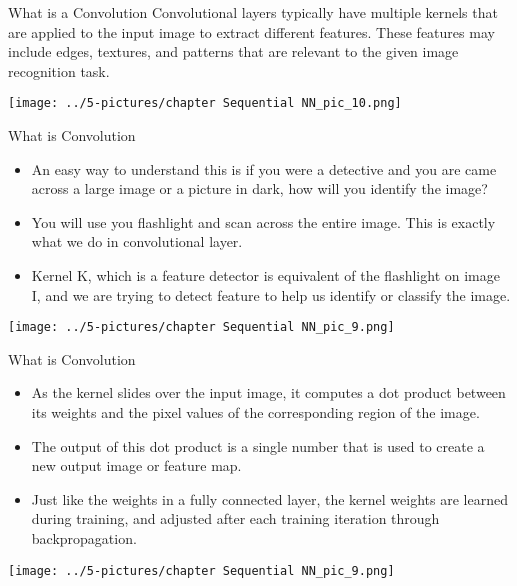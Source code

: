 \documentclass[11pt]{beamer}
\begin{document}
\begin{frame}{What is a Convolution}
\footnotesize{
Convolutional layers typically have multiple kernels that are applied to the input image to extract different features. These features may include edges, textures, and patterns that are relevant to the given image recognition task.}
	\begin{center}
	\texttt{[image: ../5-pictures/chapter Sequential NN\_pic\_10.png]}
	\end{center}
\end{frame}
\begin{frame}{What is Convolution}
\footnotesize{
\begin{itemize}
\item An easy way to understand this is if you were a detective and you are came across a large image or a picture in dark, how will you identify the image?

\item You will use you flashlight and scan across the entire image. This is exactly what we do in convolutional layer.

\item Kernel K, which is a feature detector is equivalent of the flashlight on image I, and we are trying to detect feature to help us identify or classify the image.
\end{itemize}}
	\begin{center}
	\texttt{[image: ../5-pictures/chapter Sequential NN\_pic\_9.png]}
	\end{center}
\end{frame}
\begin{frame}{What is Convolution}
\footnotesize{
\begin{itemize}
\item As the kernel slides over the input image, it computes a dot product between its weights and the pixel values of the corresponding region of the image. 
\item The output of this dot product is a single number that is used to create a new output image or feature map.
\item Just like the weights in a fully connected layer, the kernel weights are learned during training, and adjusted after each training iteration through backpropagation.
\end{itemize}}
	\begin{center}
	\texttt{[image: ../5-pictures/chapter Sequential NN\_pic\_9.png]}
	\end{center}
\end{frame}
\end{document}
